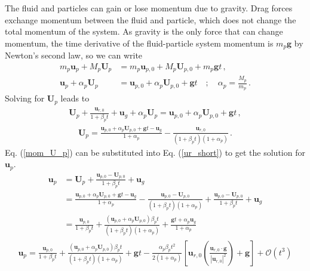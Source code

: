 The fluid and particles can gain or lose momentum due to gravity. Drag forces exchange momentum between the fluid and particle, which does not change the total momentum of the system. As gravity is the only force that can change momentum, the time derivative of the fluid-particle system momentum is $m_p \mathbf{g}$ by Newton's second law, so we can write
\begin{align}
    m_p \mathbf{u}_p + M_p \mathbf{U}_p &= m_p \mathbf{u}_{p,0} + M_p \mathbf{U}_{p,0} + m_p \mathbf{g} t \,, \\
    \label{part_mom_cons}
    \mathbf{u}_p + \alpha_p \mathbf{U}_p &= \mathbf{u}_{p,0} + \alpha_p \mathbf{U}_{p,0} + \mathbf{g} t \quad ; \quad \alpha_p = \frac{M_p}{m_p} \,.
\end{align}
Solving for $\mathbf{U}_p$ leads to
\begin{align*}
    \mathbf{U}_p + \frac{\mathbf{u}_{r,0}}{1 + \beta_p t} + \mathbf{u}_g + \alpha_p \mathbf{U}_p = \mathbf{u}_{p,0} + \alpha_p \mathbf{U}_{p,0} + \mathbf{g} t \,,
\end{align*}
\begin{align}
    \label{mom_U_p}
    \mathbf{U}_p = \frac{\mathbf{u}_{p,0} + \alpha_p \mathbf{U}_{p,0} + \mathbf{g} t - \mathbf{u}_g}{1 + \alpha_p} - \frac{\mathbf{u}_{r,0}}{(1 + \beta_p t)(1 + \alpha_p)} \,.
\end{align}
Eq. (\ref{mom_U_p}) can be substituted into Eq. (\ref{ur_short}) to get the solution for $\mathbf{u}_p$.
\begin{align*}
    \mathbf{u}_p &= \mathbf{U}_p + \frac{\mathbf{u}_{p,0} - \mathbf{U}_{p,0}}{1 + \beta_p t} + \mathbf{u}_g \\
    &= \frac{\mathbf{u}_{p,0} + \alpha_p \mathbf{U}_{p,0} + \mathbf{g} t - \mathbf{u}_g}{1 + \alpha_p} - \frac{\mathbf{u}_{p,0} - \mathbf{U}_{p,0}}{(1 + \beta_p t)(1 + \alpha_p)} + \frac{\mathbf{u}_{p,0} - \mathbf{U}_{p,0}}{1 + \beta_p t} + \mathbf{u}_g \\
    &= \frac{\mathbf{u}_{p,0}}{1 + \beta_p t} + \frac{(\mathbf{u}_{p,0} + \alpha_p \mathbf{U}_{p,0})\beta_p t}{(1 + \beta_p t)(1 + \alpha_p)} + \frac{\mathbf{g} t + \alpha_p \mathbf{u}_g}{1 + \alpha_p}
\end{align*}
\begin{align}
    \label{mom_u_p_full}
    \mathbf{u}_p = \frac{\mathbf{u}_{p,0}}{1 + \beta_p t} + \frac{(\mathbf{u}_{p,0} + \alpha_p \mathbf{U}_{p,0})\beta_p t}{(1 + \beta_p t)(1 + \alpha_p)} + \mathbf{g} t - \frac{\alpha_p \beta_p t^2}{2 (1 + \alpha_p)} \left[\mathbf{u}_{r,0} \left(\frac{\mathbf{u}_{r,0} \cdot \mathbf{g}}{|\mathbf{u}_{r,0}|^2}\right) + \mathbf{g}\right] + \mathcal{O}(t^3)
\end{align}
